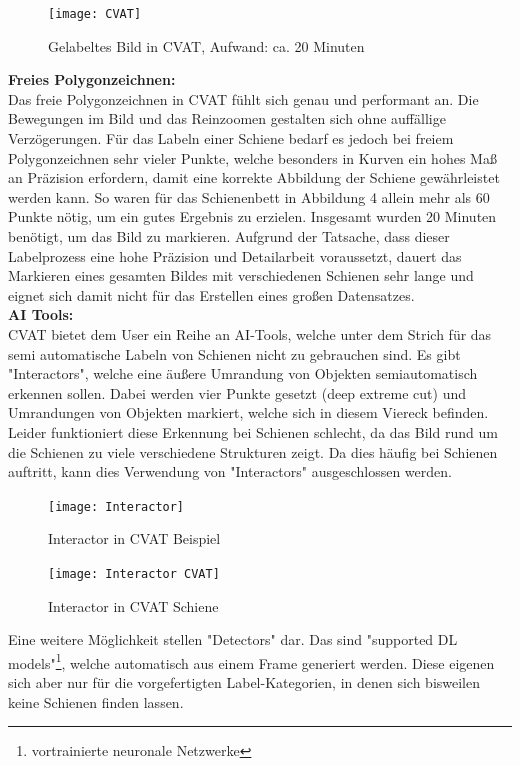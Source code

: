 \documentclass[11pt]{scrartcl}
\begin{document}
\noindent

\begin{figure}[H]
  \texttt{[image: CVAT]}
  \caption{Gelabeltes Bild in CVAT, Aufwand: ca. 20 Minuten}
\end{figure}
\noindent
\textbf{Freies Polygonzeichnen: } 
\\

\noindent
Das freie Polygonzeichnen in CVAT fühlt sich genau und performant an. Die Bewegungen im Bild und das Reinzoomen gestalten sich ohne auffällige Verzögerungen. Für das Labeln einer Schiene bedarf es jedoch bei freiem Polygonzeichnen sehr vieler Punkte, welche besonders in Kurven ein hohes Maß an Präzision erfordern, damit eine korrekte Abbildung der Schiene gewährleistet werden kann. So waren für das Schienenbett in Abbildung 4 allein mehr als 60 Punkte nötig, um ein gutes Ergebnis zu erzielen. Insgesamt wurden 20 Minuten benötigt, um das Bild zu markieren. Aufgrund der Tatsache, dass dieser Labelprozess eine hohe Präzision und Detailarbeit voraussetzt, dauert das Markieren eines gesamten Bildes mit verschiedenen Schienen sehr lange und eignet sich damit nicht für das Erstellen eines großen Datensatzes.
\\ 

\noindent
\textbf{AI Tools: } 
\\

\noindent
CVAT bietet dem User ein Reihe an AI-Tools, welche unter dem Strich für das semi automatische Labeln von Schienen nicht zu gebrauchen sind. Es gibt "Interactors", welche eine äußere Umrandung von Objekten semiautomatisch erkennen sollen. Dabei werden vier Punkte gesetzt (deep extreme cut) und Umrandungen von Objekten markiert, welche sich in diesem Viereck befinden. Leider funktioniert diese Erkennung bei Schienen schlecht, da das Bild rund um die Schienen zu viele verschiedene Strukturen zeigt. Da dies häufig bei Schienen auftritt, kann dies Verwendung von "Interactors" ausgeschlossen werden. 
\begin{figure}[H]
  \texttt{[image: Interactor]}
  \caption{Interactor in CVAT Beispiel}
\end{figure}
\begin{figure}[H]
  \texttt{[image: Interactor CVAT]}
  \caption{Interactor in CVAT Schiene }
\end{figure}

\noindent
Eine weitere Möglichkeit stellen "Detectors" dar. Das sind "supported DL models"\footnote{vortrainierte neuronale Netzwerke}, welche automatisch aus einem Frame generiert werden. Diese eigenen sich aber nur für die vorgefertigten Label-Kategorien, in denen sich bisweilen keine Schienen finden lassen. 
\\
\end{document}
